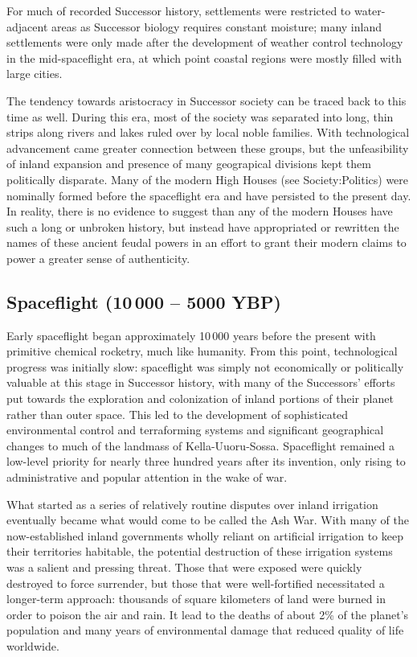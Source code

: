 \documentclass[11pt]{report}
\begin{document}
    For much of recorded Successor history, settlements were restricted to water-adjacent areas as Successor biology requires constant moisture; many inland settlements were only made after the development of weather control technology in the mid-spaceflight era, at which point coastal regions were mostly filled with large cities.

    The tendency towards aristocracy in Successor society can be traced back to this time as well. During this era, most of the society was separated into long, thin strips along rivers and lakes ruled over by local noble families. With technological advancement came greater connection between these groups, but the unfeasibility of inland expansion and presence of many geograpical divisions kept them politically disparate. Many of the modern High Houses (see Society:Politics) were nominally formed before the spaceflight era and have persisted to the present day. In reality, there is no evidence to suggest than any of the modern Houses have such a long or unbroken history, but instead have appropriated or rewritten the names of these ancient feudal powers in an effort to grant their modern claims to power a greater sense of authenticity. 

    \subsection{Spaceflight (10\,000 -- 5000 YBP)}

    Early spaceflight began approximately 10\,000 years before the present with primitive chemical rocketry, much like humanity. From this point, technological progress was initially slow: spaceflight was simply not economically or politically valuable at this stage in Successor history, with many of the Successors' efforts put towards the exploration and colonization of inland portions of their planet rather than outer space. This led to the development of sophisticated environmental control and terraforming systems and significant geographical changes to much of the landmass of Kella-Uuoru-Sossa. Spaceflight remained a low-level priority for nearly three hundred years after its invention, only rising to administrative and popular attention in the wake of war.

    What started as a series of relatively routine disputes over inland irrigation eventually became what would come to be called the Ash War. With many of the now-established inland governments wholly reliant on artificial irrigation to keep their territories habitable, the potential destruction of these irrigation systems was a salient and pressing threat. Those that were exposed were quickly destroyed to force surrender, but those that were well-fortified necessitated a longer-term approach: thousands of square kilometers of land were burned in order to poison the air and rain. It lead to the deaths of about 2\% of the planet's population and many years of environmental damage that reduced quality of life worldwide.
    
\end{document}
